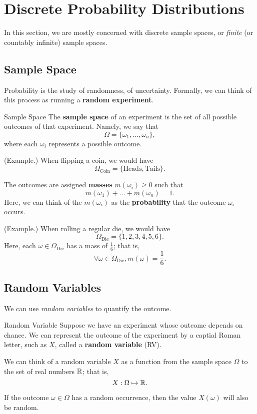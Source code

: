 \section{Discrete Probability Distributions}
In this section, we are mostly concerned with discrete sample spaces, or \emph{finite} (or countably infinite) sample spaces. 

\subsection{Sample Space}
Probability is the study of randomness, of uncertainty. Formally, we can think of this process as running a \textbf{random experiment}.

\begin{definition}{Sample Space}{}
    The \textbf{sample space} of an experiment is the set of all possible outcomes of that experiment. Namely, we say that 
    \[\Omega = \{\omega_1, \dots, \omega_n\},\]
    where each $\omega_i$ represents a possible outcome.
\end{definition}

\begin{mdframed}[]
    (Example.) When flipping a coin, we would have 
    \[\Omega_{\text{Coin}} = \{\text{Heads}, \text{Tails}\}.\]
\end{mdframed}

The outcomes are assigned \textbf{masses} $m(\omega_i) \geq 0$ such that 
\[m(\omega_1) + \dots + m(\omega_n) = 1.\]
Here, we can think of the $m(\omega_i)$ as the \textbf{probability} that the outcome $\omega_i$ occurs. 

\begin{mdframed}[]
    (Example.) When rolling a regular die, we would have 
    \[\Omega_{\text{Die}} = \{1, 2, 3, 4, 5, 6\}.\]
    Here, each $\omega \in \Omega_{\text{Die}}$ has a mass of $\frac{1}{6}$; that is, 
    \[\forall \omega \in \Omega_{\text{Die}}, m(\omega) = \frac{1}{6}.\]
\end{mdframed}


\subsection{Random Variables}
We can use \emph{random variables} to quantify the outcome. 
\begin{definition}{Random Variable}{}
    Suppose we have an experiment whose outcome depends on chance. We can represent the outcome of the experiment by a captial Roman letter, such as $X$, called a \textbf{random variable} (RV).

    \bigskip 

    We can think of a random variable $X$ as a function from the sample space $\Omega$ to the set of real numbers $\mathbb{R}$; that is, 
    \[X: \Omega \mapsto \mathbb{R}.\]
\end{definition}
If the outcome $\omega \in \Omega$ has a random occurrence, then the value $X(\omega)$ will also be random. 

